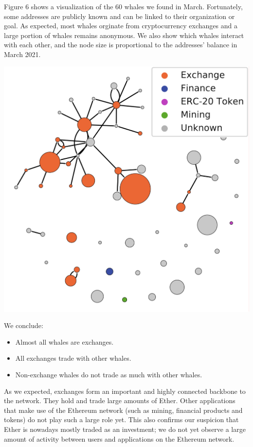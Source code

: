 \documentclass[10pt,a4paper]{article}
\newenvironment{Figure}
  {\par\medskip\noindent\minipage{\linewidth}}
  {\endminipage\par\medskip}
\begin{document}
\begin{multicols}{2}
Figure 6 shows a visualization of the 60 whales we found in March. Fortunately, some addresses are publicly known and can be linked to their organization or goal. As expected, most whales orginate from cryptocurrency exchanges and a large portion of whales remains anonymous. We also show which whales interact with each other, and the node size is proportional to the addresses' balance in March 2021. 

\vspace{5pt}
\begin{Figure}
\centering
\includegraphics[scale=0.23]{figures/whales.pdf}
\label{whales}
\end{Figure}

We conclude:
\begin{itemize}
\item{Almost all whales are exchanges.}
\item{All exchanges trade with other whales.}
\item{Non-exchange whales do not trade as much with other whales.}
\end{itemize}

As we expected, exchanges form an important and highly connected backbone to the network. They hold and trade large amounts of Ether. Other applications that make use of the Ethereum network (such as mining, financial products and tokens) do not play such a large role yet. This also confirms our suspicion that Ether is nowadays mostly traded as an investment; we do not yet observe a large amount of activity between users and applications on the Ethereum network.


\end{multicols}
\end{document}
